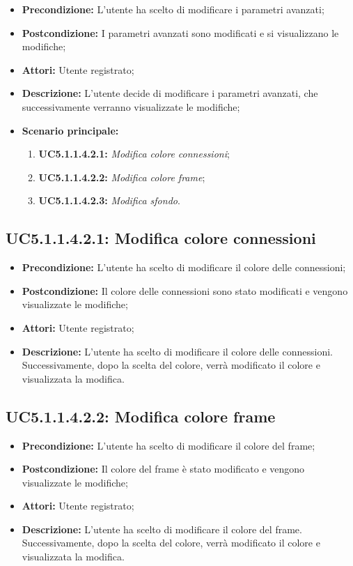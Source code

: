 \begin{itemize}
	\item \textbf{Precondizione:} L'utente ha scelto di modificare i parametri avanzati;
	\item \textbf{Postcondizione:} I parametri avanzati sono modificati e si visualizzano le modifiche;
	\item \textbf{Attori:} Utente registrato;
	\item \textbf{Descrizione:} L'utente decide di modificare i parametri avanzati, che successivamente verranno visualizzate le modifiche;
	\item \textbf{Scenario principale:}
	\begin{enumerate}
		\item \textbf{ UC5.1.1.4.2.1:} \textit{ Modifica colore connessioni};
		\item \textbf{ UC5.1.1.4.2.2:} \textit{ Modifica colore frame};
		\item \textbf{ UC5.1.1.4.2.3:} \textit{ Modifica sfondo}.
	\end{enumerate}
\end{itemize}
\subsection{ UC5.1.1.4.2.1: Modifica colore connessioni}

\begin{itemize}
	\item \textbf{Precondizione:} L'utente ha scelto di modificare il colore delle connessioni;
	\item \textbf{Postcondizione:} Il colore delle connessioni sono stato modificati e vengono visualizzate le modifiche;
	\item \textbf{Attori:} Utente registrato;
	\item \textbf{Descrizione:} L'utente ha scelto di modificare il colore delle connessioni.  Successivamente, dopo la scelta del colore, verrà modificato il colore e visualizzata la modifica.
\end{itemize}
\subsection{ UC5.1.1.4.2.2: Modifica colore frame}

\begin{itemize}
	\item \textbf{Precondizione:} L'utente ha scelto di modificare il colore del frame;
	\item \textbf{Postcondizione:} Il colore del frame è stato modificato e vengono visualizzate le modifiche;
	\item \textbf{Attori:} Utente registrato;
	\item \textbf{Descrizione:} L'utente ha scelto di modificare il colore del frame.  Successivamente, dopo la scelta del colore, verrà modificato il colore e visualizzata la modifica.
\end{itemize}
